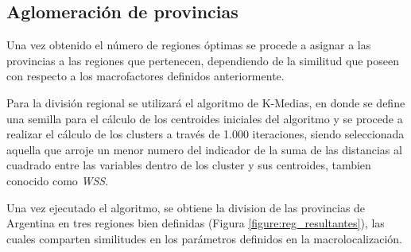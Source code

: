 \documentclass[12pt,a4paper]{article}
\begin{document}
\subsection{Aglomeración de provincias}
Una vez obtenido el número de regiones óptimas se procede a asignar a las provincias a las regiones que pertenecen, dependiendo de la similitud que poseen con respecto a los macrofactores definidos anteriormente.

Para la división regional se utilizará el algoritmo de K-Medias, en donde se define una semilla para el cálculo de los centroides iniciales del algoritmo y se procede a realizar el cálculo de los clusters a través de 1.000 iteraciones, siendo seleccionada aquella  que arroje un menor numero del indicador de la suma de las distancias al cuadrado entre las variables dentro de  los cluster y sus centroides, tambien conocido como \textit{WSS}.

Una vez ejecutado el algoritmo, se obtiene la division de las provincias de Argentina en tres regiones bien definidas (Figura \ref{figure:reg_resultantes}), las cuales comparten similitudes en los parámetros definidos en la macrolocalización.
\end{document}
